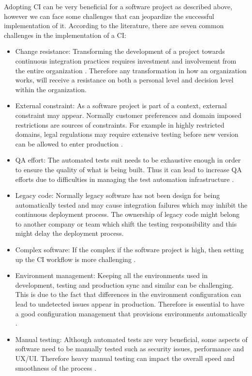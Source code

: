 Adopting CI can be very beneficial for a software project as described above, however we can face some challenges that can jeopardize the successful implementation of it. According to the literature, there are seven common challenges in the implementation of a CI:

\begin{itemize}
\item Change resistance: Transforming the development of a project towards continuous integration practices requires investment and involvement from the entire organization \cite{Rodriguez2016}. Therefore any transformation in how an organization works, will receive a resistance on both a personal level and decision level within the organization.
\item External constraint: As a software project is part of a context, external constraint may appear. Normally customer preferences and domain imposed restrictions are sources of constraints. For example in highly restricted domains, legal regulations may require extensive testing before new version can be allowed to enter production \cite{Rodriguez2016}.
\item QA effort: The automated tests suit needs to be exhaustive enough in order to ensure the quality of what is being built. Thus it can lead to increase QA efforts due to difficulties in managing the test automation infrastructure \cite{Rodriguez2016}.
\item Legacy code: Normally legacy software has not been design for being automatically tested and may cause integration failures which may inhibit the continuous deployment process. The ownership of legacy code might belong to another company or team which shift the testing responsibility and this might delay the deployment process.
\item Complex software: If the complex if the software project is high, then setting up the CI workflow is more challenging \cite{Leppanen2015}.
\item Environment management: Keeping all the environments used in development, testing and production sync and similar can be challenging. This is due to the fact that differences in the environment configuration can lead to undetected issues appear in production. Therefore is essential to have a good configuration management that provisions environments automatically \cite{Leppanen2015}.
\item Manual testing: Although automated tests are very beneficial, some aspects of software need to be manually tested such as security issues, performance and UX/UI. Therefore 	heavy manual testing can impact the overall speed and smoothness of the process \cite{Leppanen2015}.
\end{itemize}

